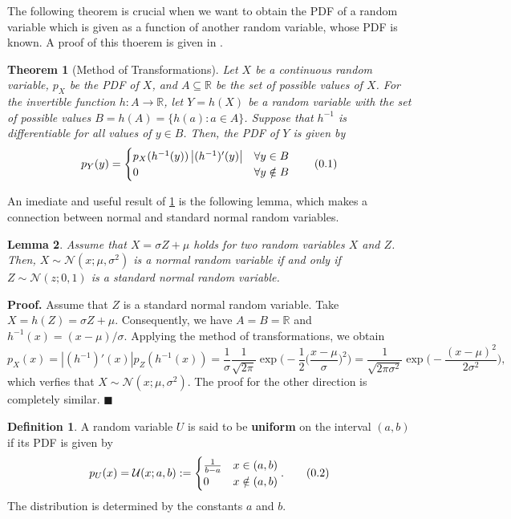 \documentclass[10pt]{article}
\newtheorem{thm}{Theorem}[section]
\newtheorem{lem}[thm]{Lemma}
\theoremstyle{definition}
\newtheorem{defn}{Definition}[section]
\newenvironment{prf}{\noindent\textbf{Proof.}}{\hfill$\blacksquare$}
\newcommand\eqnum{\addtocounter{equation}{1}\tag{\arabic{section}.\arabic{equation}}}
\begin{document}
The following theorem is crucial when we want to obtain the PDF of a random variable which is given as a function of another random variable, whose PDF is known. A proof of this thoerem is given in \cite{Gharamani2019}.
\begin{thm}[Method of Transformations]\label{thm:MT}
Let $X$ be a continuous random variable, $p_X$ be the PDF of $X$, and $A\subseteq\mathbb{R}$ be the set of possible values of $X$. For the invertible function $h:A\to\mathbb{R}$, let $Y=h(X)$ be a random variable with the set of possible values $B=h(A)=\{h(a): a\in A\}$. Suppose that $h^{-1}$ is differentiable for all values of $y\in B$. Then, the PDF of $Y$  is given by
\begin{equation*}
p_Y(y) = 
\begin{cases}
p_X(h^{-1}(y))\left|(h^{-1})'(y)\right| & \forall y \in B  \\
0 & \forall y \notin B 
\end{cases}
\eqnum
\end{equation*}
\end{thm}
\noindent
An imediate and useful result of \cref{thm:MT} is the following lemma, which makes a connection between normal and standard normal random variables.
\begin{lem}
Assume that $X=\sigma Z + \mu$ holds for two random variables $X$ and $Z$. Then, $X\sim\mathcal{N}(x; \mu, \sigma^2)$ is a normal random variable if and only if $Z\sim\mathcal{N}(z; 0, 1)$  is a standard normal random variable.
\end{lem}
\begin{prf}
Assume that $Z$ is a standard normal random variable. Take $X=h(Z)=\sigma Z + \mu$. Consequently, we have $A=B=\mathbb{R}$ and $h^{-1}(x)=(x-\mu)/\sigma$. Applying the method of transformations, we obtain
\begin{equation*}
p_X(x)=|(h^{-1})'(x)|p_Z(h^{-1}(x))
=\frac{1}{\sigma}\frac{1}{\sqrt{2\pi}}\exp\Big(-\frac{1}{2}\Big(\frac{x-\mu}{\sigma}\Big)^2\Big)
=\frac{1}{\sqrt{2\pi\sigma^2}}\exp\Big(-\frac{(x-\mu)^2}{2\sigma^2}\Big),
\end{equation*}
which verfies that  $X\sim\mathcal{N}(x; \mu, \sigma^2)$. The proof for the other direction is completely similar.
\end{prf}
\begin{defn}
A random variable $U$ is said to be \textbf{uniform} on the interval $(a, b)$ if its PDF is given by
\begin{equation*}
p_U(x) = \mathcal{U}(x; a, b) :=
\begin{cases} 
\frac{1}{b-a} & x \in (a, b) \\
0 & x \notin (a, b)
\end{cases}.
\eqnum
\end{equation*}
The distribution is determined by the constants $a$ and $b$. 
\end{defn}
\end{document}
